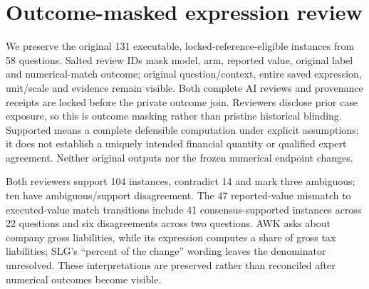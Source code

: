 \section{Outcome-masked expression review}
\label{app:expression-semantics}

We preserve the original 131 executable, locked-reference-eligible instances from 58 questions. Salted review IDs mask model, arm, reported value, original label and numerical-match outcome; original question/context, entire saved expression, unit/scale and evidence remain visible. Both complete AI reviews and provenance receipts are locked before the private outcome join. Reviewers disclose prior case exposure, so this is outcome masking rather than pristine historical blinding. Supported means a complete defensible computation under explicit assumptions; it does not establish a uniquely intended financial quantity or qualified expert agreement. Neither original outputs nor the frozen numerical endpoint changes.

Both reviewers support 104 instances, contradict 14 and mark three ambiguous; ten have ambiguous/support disagreement. The 47 reported-value mismatch to executed-value match transitions include 41 consensus-supported instances across 22 questions and six disagreements across two questions. AWK asks about company gross liabilities, while its expression computes a share of gross tax liabilities; SLG's ``percent of the change'' wording leaves the denominator unresolved. These interpretations are preserved rather than reconciled after numerical outcomes become visible.

